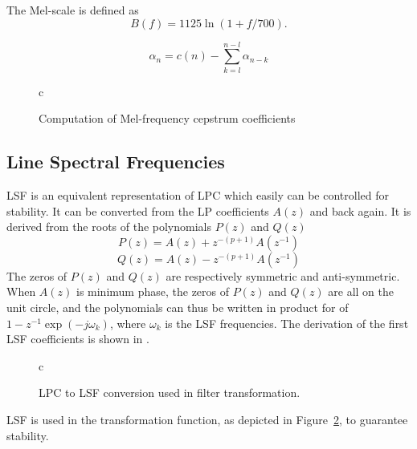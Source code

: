 The Mel-scale is defined as \cite{taletek}
\begin{equation}
	B(f) = 1125\ln(1+f/700).
\end{equation}

\begin{equation}
	\alpha_n = c(n)-\sum_{k=l}^{n-l} \alpha_{n-k}
\end{equation}

\begin{figure}[htbp]
  \centering
  \begin{tabular}[h]{c}
  \end{tabular}
  \caption{Computation of Mel-frequency cepstrum coefficients}
  \label{fig:mfcc}
\end{figure}

\subsection{Line Spectral Frequencies} %
\label{sub:line_spectral_frequencies}

LSF is an equivalent representation of LPC which easily can be controlled for stability. It can be converted from the LP coefficients $A(z)$ and back again. It is derived from the roots of the polynomials $P(z)$ and $Q(z)$ 
\begin{equation}
	\label{eq:p_z}
	P(z) = A(z)+z^{-(p+1)}A(z^{-1})
\end{equation}
\begin{equation}
	\label{eq:q_z}
	Q(z) = A(z)-z^{-(p+1)}A(z^{-1})
\end{equation}
The zeros of $P(z)$ and $Q(z)$ are respectively symmetric and anti-symmetric. When $A(z)$ is minimum phase, the zeros of $P(z)$ and $Q(z)$ are all on the unit circle, and the polynomials can thus be written in product for of
$1-z^{-1}\exp(-j\omega_k)$, where $\omega_k$ is the LSF frequencies. The derivation of the first LSF coefficients is shown in \cite[p. 304]{taletek}.

\begin{figure}[htbp]
	\centering
	\begin{tabular}[h]{c}
	\end{tabular}
	\caption{LPC to LSF conversion used in filter transformation.}
	\label{fig:lpc_to_lsf}
\end{figure}
LSF is used in the transformation function, as depicted in Figure~\ref{fig:lpc_to_lsf}, to guarantee stability.


